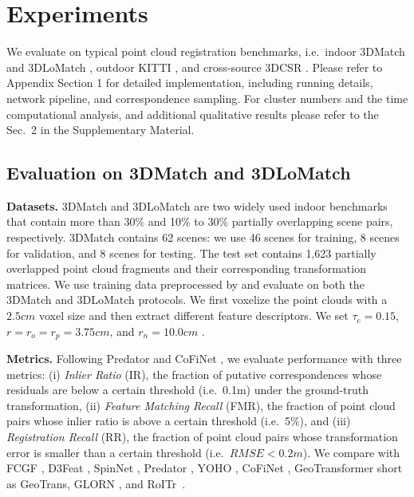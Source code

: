 \section{Experiments}
\label{sec:exp}
We evaluate \ourmethod on typical point cloud registration benchmarks, i.e.~indoor 3DMatch \cite{zeng20173dmatch} and 3DLoMatch \cite{huang2021predator}, outdoor KITTI \cite{geiger2012we}, and cross-source 3DCSR \cite{huang2021comprehensive}.
Please refer to Appendix Section 1 for detailed implementation, including running details, network pipeline, and correspondence sampling.
For cluster numbers and the time computational analysis, and additional qualitative results please refer to the Sec.~2 in the Supplementary Material.

\subsection{Evaluation on 3DMatch and 3DLoMatch}


\noindent\textbf{Datasets.} 
3DMatch \cite{zeng20173dmatch} and 3DLoMatch \cite{huang2021predator} are two widely used indoor benchmarks that contain more than $30\%$ and 10\% to 30\% partially overlapping scene pairs, respectively. 
3DMatch contains 62 scenes: we use 46 scenes for training, 8 scenes for validation, and 8 scenes for testing. 
The test set contains 1,623 partially overlapped point cloud fragments and their corresponding transformation matrices. 
We use training data preprocessed by \cite{huang2021predator} and evaluate on both the 3DMatch and 3DLoMatch \cite{huang2021predator} protocols. 
We first voxelize the point clouds with a $2.5cm$ voxel size and then extract different feature descriptors. 
We set $\tau_c=0.15$, $r=r_o=r_p=3.75cm$, and $r_n=10.0cm$ \cite{huang2021predator}.



\noindent\textbf{Metrics.} 
Following Predator \cite{huang2021predator} and CoFiNet \cite{yu2021cofinet}, we evaluate performance with three metrics: 
(i) \textit{Inlier Ratio} (IR), the fraction of putative correspondences whose residuals are below a certain threshold (i.e.~0.1m) under the ground-truth transformation, 
(ii) \textit{Feature Matching Recall} (FMR), the fraction of point cloud pairs whose inlier ratio is above a certain threshold (i.e.~5\%), and 
(iii) \textit{Registration Recall} (RR), the fraction of point cloud pairs whose transformation error is smaller than a certain threshold (i.e.~$RMSE<0.2m$). 
We compare \ourmethod with FCGF \cite{choy2019fully}, D3Feat \cite{bai2020d3feat}, SpinNet \cite{ao2021spinnet}, Predator \cite{huang2021predator}, YOHO \cite{wang2022you}, CoFiNet \cite{yu2021cofinet}, GeoTransformer \cite{qin2022geometric} short as GeoTrans, GLORN \cite{xu2022glorn}, and RoITr~\cite{yu2023rotation}.

